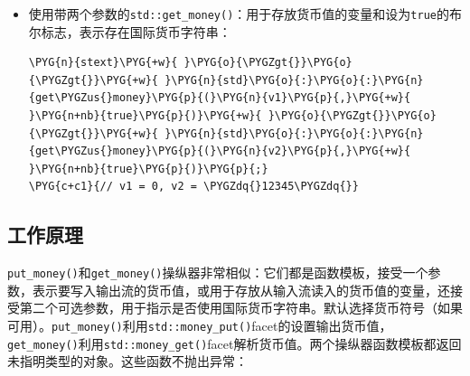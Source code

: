 \begin{itemize}

\item 使用带两个参数的\texttt{std::\allowbreak{}get\_\allowbreak{}money()}：用于存放货币值的变量和设为\texttt{true}的布尔标志，表示存在国际货币字符串：



\begin{codeblockbg}
\begin{Verbatim}[commandchars=\\\{\},breaklines=true,breakanywhere=true,fontsize=\codefont,xleftmargin=17bp]
\PYG{n}{stext}\PYG{+w}{ }\PYG{o}{\PYGZgt{}}\PYG{o}{\PYGZgt{}}\PYG{+w}{ }\PYG{n}{std}\PYG{o}{:}\PYG{o}{:}\PYG{n}{get\PYGZus{}money}\PYG{p}{(}\PYG{n}{v1}\PYG{p}{,}\PYG{+w}{ }\PYG{n+nb}{true}\PYG{p}{)}\PYG{+w}{ }\PYG{o}{\PYGZgt{}}\PYG{o}{\PYGZgt{}}\PYG{+w}{ }\PYG{n}{std}\PYG{o}{:}\PYG{o}{:}\PYG{n}{get\PYGZus{}money}\PYG{p}{(}\PYG{n}{v2}\PYG{p}{,}\PYG{+w}{ }\PYG{n+nb}{true}\PYG{p}{)}\PYG{p}{;}
\PYG{c+c1}{// v1 = 0, v2 = \PYGZdq{}12345\PYGZdq{}}
\end{Verbatim}
\end{codeblockbg}

\end{itemize}



\subsection{工作原理}



\texttt{put\_\allowbreak{}money()}和\texttt{get\_\allowbreak{}money()}操纵器非常相似：它们都是函数模板，接受一个参数，表示要写入输出流的货币值，或用于存放从输入流读入的货币值的变量，还接受第二个可选参数，用于指示是否使用国际货币字符串。默认选择货币符号（如果可用）。\texttt{put\_\allowbreak{}money()}利用\texttt{std::\allowbreak{}money\_\allowbreak{}put()}facet的设置输出货币值，\texttt{get\_\allowbreak{}money()}利用\texttt{std::\allowbreak{}money\_\allowbreak{}get()}facet解析货币值。两个操纵器函数模板都返回未指明类型的对象。这些函数不抛出异常：



